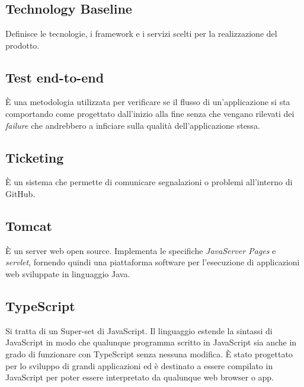 \section{}
\subsection*{Technology Baseline} Definisce le tecnologie, i framework e i servizi scelti per la realizzazione del prodotto.

\subsection*{Test end-to-end} È una metodologia utilizzata per verificare se il flusso di un'applicazione si sta comportando come progettato dall'inizio alla fine senza che vengano rilevati dei \textit{failure} che andrebbero a inficiare sulla qualità dell'applicazione stessa.

\subsection*{Ticketing} È un sistema che permette di comunicare segnalazioni o problemi all'interno di GitHub.

\subsection*{Tomcat} È un server web open source. Implementa le specifiche \textit{JavaServer Pages} e \textit{servlet}, fornendo quindi una piattaforma software per l'esecuzione di applicazioni web sviluppate in linguaggio Java.

\subsection*{TypeScript} Si tratta di un Super-set di JavaScript. Il linguaggio estende la sintassi di JavaScript in modo che qualunque programma scritto in JavaScript sia anche in grado di funzionare con TypeScript senza nessuna modifica. È stato progettato per lo sviluppo di grandi applicazioni ed è destinato a essere compilato in JavaScript per poter essere interpretato da qualunque web browser o app.